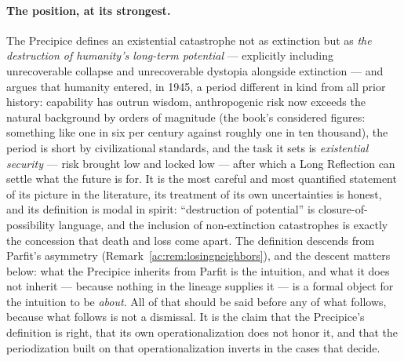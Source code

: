 \documentclass[11pt]{article}
\numberwithin{equation}{section}
\theoremstyle{plain}
\theoremstyle{definition}
\theoremstyle{remark}
\begin{document}
\paragraph{The position, at its strongest.} The Precipice defines an
existential catastrophe not as extinction but as \emph{the destruction
of humanity's long-term potential} --- explicitly including
unrecoverable collapse and unrecoverable dystopia alongside extinction
--- and argues that humanity entered, in 1945, a period different in
kind from all prior history: capability has outrun wisdom, anthropogenic
risk now exceeds the natural background by orders of magnitude (the
book's considered figures: something like one in six per century
against roughly one in ten thousand), the period is short by
civilizational standards, and the task it sets is \emph{existential
security} --- risk brought low and locked low --- after which a Long
Reflection can settle what the future is for. It is the most careful
and most quantified statement of its picture in the literature, its
treatment of its own uncertainties is honest, and its definition is
modal in spirit: ``destruction of potential'' is closure-of-possibility
language, and the inclusion of non-extinction catastrophes is exactly
the concession that death and loss come apart. The definition
descends from Parfit's asymmetry \cite{Parfit84}
(Remark~\ref{ac:rem:losingneighbors}), and the descent matters below:
what the Precipice inherits from Parfit is the intuition, and what it
does not inherit --- because nothing in the lineage supplies it --- is
a formal object for the intuition to be \emph{about}. All of that should be
said before any of what follows, because what follows is not a
dismissal. It is the claim that the Precipice's definition is right,
that its own operationalization does not honor it, and that the
periodization built on that operationalization inverts in the cases
that decide.
\end{document}
